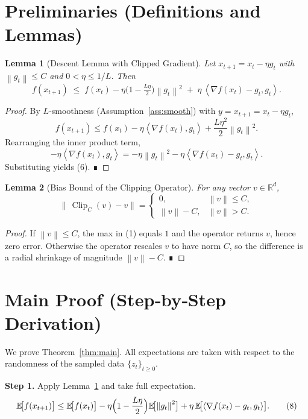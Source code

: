 \documentclass{article}
\newtheorem{lemma}{Lemma}
\newcommand{\E}{\mathbb{E}}
\newcommand{\R}{\mathbb{R}}
\newcommand{\norm}[1]{\left\lVert#1\right\rVert}
\newcommand{\inner}[2]{\left\langle #1,#2\right\rangle}
\begin{document}
\section*{Preliminaries (Definitions and Lemmas)}
\begin{lemma}[Descent Lemma with Clipped Gradient]\label{lem:descent}
Let $x_{t+1}=x_t-\eta g_t$ with $\norm{g_t}\le C$ and $0<\eta\le 1/L$.
Then
\[
f(x_{t+1})\;\le\;f(x_t)-\eta\bigl(1-\tfrac{L\eta}{2}\bigr)\norm{g_t}^{2}
\;+\;\eta\,\inner{\nabla f(x_t)-g_t}{g_t}.
\tag{6}
\]
\end{lemma}
\begin{proof}
By $L$‑smoothness (Assumption~\ref{ass:smooth}) with $y=x_{t+1}=x_t-\eta g_t$,
\[
f(x_{t+1})\le f(x_t)-\eta\inner{\nabla f(x_t)}{g_t}
+\frac{L\eta^{2}}{2}\norm{g_t}^{2}.
\]
Rearranging the inner product term,
\[
-\eta\inner{\nabla f(x_t)}{g_t}
= -\eta\norm{g_t}^{2}
-\eta\inner{\nabla f(x_t)-g_t}{g_t}.
\]
Substituting yields (6). ∎
\end{proof}

\begin{lemma}[Bias Bound of the Clipping Operator]\label{lem:bias}
For any vector $v\in\R^{d}$,
\[
\bigl\|\,\operatorname{Clip}_C(v)-v\bigr\|
=
\begin{cases}
0, & \norm{v}\le C,\\[4pt]
\norm{v}-C, & \norm{v}>C .
\end{cases}
\tag{7}
\]
\end{lemma}
\begin{proof}
If $\norm{v}\le C$, the max in (1) equals $1$ and the operator returns $v$,
hence zero error.  Otherwise the operator rescales $v$ to have norm $C$,
so the difference is a radial shrinkage of magnitude $\norm{v}-C$. ∎
\end{proof}

\section*{Main Proof (Step‑by‑Step Derivation)}
We prove Theorem~\ref{thm:main}.  All expectations are taken with respect to the
randomness of the sampled data $\{z_t\}_{t\ge0}$.

\noindent\textbf{Step 1.} Apply Lemma~\ref{lem:descent} and take full expectation.
\[
\E\!\bigl[f(x_{t+1})\bigr]
\le \E\!\bigl[f(x_t)\bigr]
-\eta\Bigl(1-\frac{L\eta}{2}\Bigr)\E\!\bigl[\norm{g_t}^{2}\bigr]
+\eta\,\E\!\bigl[\inner{\nabla f(x_t)-g_t}{g_t}\bigr].
\tag{8}
\]
\end{document}
